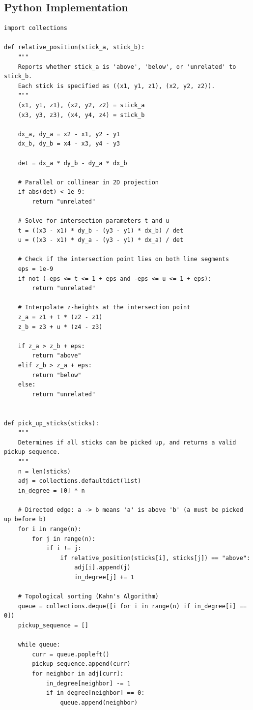 \documentclass[12pt]{article}
\begin{document}
\subsection*{Python Implementation}
\begin{lstlisting}[style=code]
import collections

def relative_position(stick_a, stick_b):
    """
    Reports whether stick_a is 'above', 'below', or 'unrelated' to stick_b.
    Each stick is specified as ((x1, y1, z1), (x2, y2, z2)).
    """
    (x1, y1, z1), (x2, y2, z2) = stick_a
    (x3, y3, z3), (x4, y4, z4) = stick_b

    dx_a, dy_a = x2 - x1, y2 - y1
    dx_b, dy_b = x4 - x3, y4 - y3

    det = dx_a * dy_b - dy_a * dx_b

    # Parallel or collinear in 2D projection
    if abs(det) < 1e-9:
        return "unrelated"

    # Solve for intersection parameters t and u
    t = ((x3 - x1) * dy_b - (y3 - y1) * dx_b) / det
    u = ((x3 - x1) * dy_a - (y3 - y1) * dx_a) / det

    # Check if the intersection point lies on both line segments
    eps = 1e-9
    if not (-eps <= t <= 1 + eps and -eps <= u <= 1 + eps):
        return "unrelated"

    # Interpolate z-heights at the intersection point
    z_a = z1 + t * (z2 - z1)
    z_b = z3 + u * (z4 - z3)

    if z_a > z_b + eps:
        return "above"
    elif z_b > z_a + eps:
        return "below"
    else:
        return "unrelated"


def pick_up_sticks(sticks):
    """
    Determines if all sticks can be picked up, and returns a valid pickup sequence.
    """
    n = len(sticks)
    adj = collections.defaultdict(list)
    in_degree = [0] * n

    # Directed edge: a -> b means 'a' is above 'b' (a must be picked up before b)
    for i in range(n):
        for j in range(n):
            if i != j:
                if relative_position(sticks[i], sticks[j]) == "above":
                    adj[i].append(j)
                    in_degree[j] += 1

    # Topological sorting (Kahn's Algorithm)
    queue = collections.deque([i for i in range(n) if in_degree[i] == 0])
    pickup_sequence = []

    while queue:
        curr = queue.popleft()
        pickup_sequence.append(curr)
        for neighbor in adj[curr]:
            in_degree[neighbor] -= 1
            if in_degree[neighbor] == 0:
                queue.append(neighbor)


\end{lstlisting}
\end{document}

